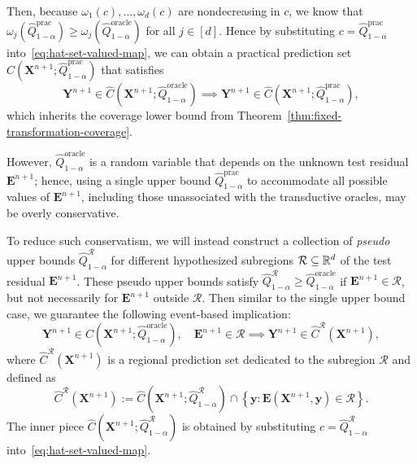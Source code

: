 Then, because $\omega_1(c),\ldots,\omega_d(c)$ are nondecreasing in $c$, we know that
$\omega_j(\hat Q^{\mathrm{prac}}_{1-\alpha})
\geq
\omega_j(\hat Q^{\mathrm{oracle}}_{1-\alpha})$
for all $j\in[d]$.
Hence by substituting $c=\hat Q^{\mathrm{prac}}_{1-\alpha}$ into~\eqref{eq:hat-set-valued-map}, we can obtain a practical prediction set $\hat C(\mathbf X^{n+1};\hat Q^{\mathrm{prac}}_{1-\alpha})$ that satisfies
\begin{equation}\label{eq:key-implication}
\mathbf Y^{n+1}\in
\hat C(\mathbf X^{n+1};\hat Q^{\mathrm{oracle}}_{1-\alpha})
\implies
\mathbf Y^{n+1}\in
\hat C(\mathbf X^{n+1};\hat Q^{\mathrm{prac}}_{1-\alpha}),
\end{equation}
which inherits the coverage lower bound from Theorem~\ref{thm:fixed-transformation-coverage}.

However, $\hat Q^{\mathrm{oracle}}_{1-\alpha}$ is a random variable that depends on the unknown test residual $\mathbf E^{n+1}$; hence, using a single upper bound $\hat Q^{\mathrm{prac}}_{1-\alpha}$ to accommodate all possible values of $\mathbf E^{n+1}$, including those unassociated with the transductive oracles, may be overly conservative.

To reduce such conservatism, we will instead construct a collection of \emph{pseudo} upper bounds $\hat Q^{\mathcal{R}}_{1-\alpha}$ for different hypothesized subregions $\mathcal{R}\subseteq\mathbb{R}^d$ of the test residual $\mathbf E^{n+1}$. These pseudo upper bounds satisfy $\hat Q^{\mathcal{R}}_{1-\alpha}\geq\hat Q^{\mathrm{oracle}}_{1-\alpha}$ if $\mathbf E^{n+1}\in\mathcal{R}$, but not necessarily for $\mathbf E^{n+1}$ outside $\mathcal{R}$. Then similar to the single upper bound case, we guarantee the following event-based implication:
\begin{equation}\label{eq:pseudo-implication}
\mathbf Y^{n+1}\in
\hat C(\mathbf X^{n+1};\hat Q^{\mathrm{oracle}}_{1-\alpha}),\quad \mathbf E^{n+1}\in\mathcal{R}
\implies
\mathbf Y^{n+1} \in \hat C^{\mathcal R}(\mathbf X^{n+1}),
\end{equation}
where $\hat C^{\mathcal R}(\mathbf X^{n+1})$ is a regional prediction set dedicated to the subregion $\mathcal{R}$ and defined as
\begin{equation}\label{eq:pseudo-prediction-set}
\hat C^{\mathcal R}(\mathbf X^{n+1})
:=
\hat C(\mathbf X^{n+1};\hat Q^{\mathcal R}_{1-\alpha})
\cap
\left\{
\mathbf y:
\mathbf E(\mathbf X^{n+1},\mathbf y)\in\mathcal R
\right\}.
\end{equation}
The inner piece $\hat{C}(\mathbf X^{n+1};\hat Q^{\mathcal{R}}_{1-\alpha})$ is obtained by substituting $c=\hat Q^{\mathcal{R}}_{1-\alpha}$ into~\eqref{eq:hat-set-valued-map}.

